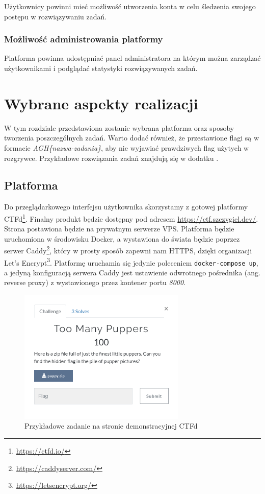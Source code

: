 \documentclass[language=polish,type=eng]{aghmodern}
\begin{document}
Użytkownicy powinni mieć możliwość utworzenia konta w celu
śledzenia swojego postępu w rozwiązywaniu zadań.

\subsection{Możliwość administrowania platformy}

Platforma powinna udostępniać panel administratora na którym
można zarządzać użytkownikami i podglądać statystyki rozwiązywanych
zadań.

\chapter{Wybrane aspekty realizacji}

W tym rozdziale przedstawiona zostanie wybrana platforma oraz
sposoby tworzenia poszczególnych zadań.
Warto dodać również, że przestawione flagi są w formacie \emph{AGH\{nazwa-zadania\}},
aby nie wyjawiać prawdziwych flag użytych w rozgrywce.
Przykładowe rozwiązania zadań znajdują się w dodatku .

\section{Platforma}

Do przeglądarkowego interfejsu użytkownika skorzystamy z gotowej
platformy CTFd\footnote{\url{https://ctfd.io/}}.
Finalny produkt będzie dostępny pod adresem
\href{https://ctf.szczygiel.dev/}{https://ctf.szczygiel.dev/}.
Strona postawiona będzie na prywatnym serwerze VPS. Platforma będzie
uruchomiona w środowisku Docker, a wystawiona do świata będzie poprzez serwer
Caddy\footnote{\url{https://caddyserver.com/}}, który w prosty sposób zapewni nam HTTPS,
dzięki organizacji Let's Encrypt\footnote{\url{https://letsencrypt.org/}}.
Platformę uruchamia się jedynie poleceniem \texttt{docker-compose up},
a jedyną konfiguracją serwera Caddy jest ustawienie odwrotnego
pośrednika (ang. reverse proxy) z wystawionego przez kontener portu \emph{8000}.

\begin{figure}[H]
\centering
\includegraphics[width=8cm]{ctfd}
\caption{Przykładowe zadanie na stronie demonstracyjnej CTFd}
\end{figure}
\end{document}
